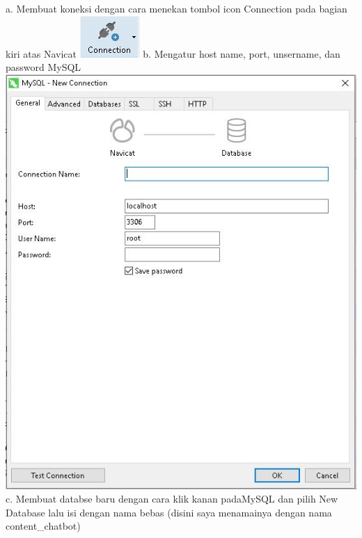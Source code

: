 \documentclass{article}
\begin{document}
\begin{enumerate}
        a. Membuat koneksi  dengan cara menekan tombol icon Connection pada bagian kiri atas Navicat 
         \newline
        \includegraphics[scale=2]{26.5a.jpg}
        \newline
        b. Mengatur  host name,  port,  unsername, dan password MySQL
          \newline
        \includegraphics[scale=0.5]{26.5b.jpg}
        \newline
        c. Membuat databse baru dengan cara klik kanan padaMySQL dan pilih New Database lalu isi dengan nama bebas (disini saya menamainya dengan nama content\_chatbot)
        \newline

\end{enumerate}
\end{document}
